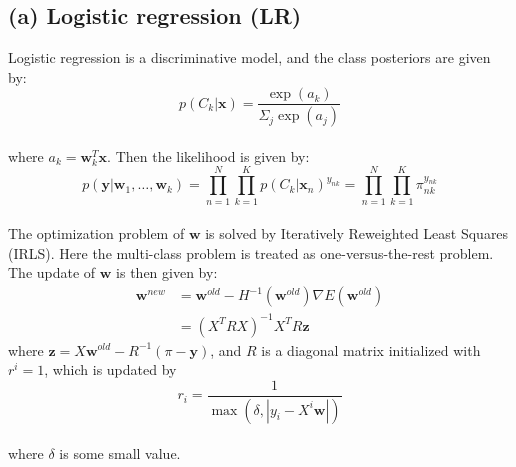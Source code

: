 \documentclass[a4paper]{article}
\begin{document}
\subsection{(a) Logistic regression (LR)}
Logistic regression is a discriminative model, and the class posteriors are given by:\\
$$p(C_{k}|\mathbf{x})=\frac{\exp(a_{k})}{\Sigma_{j}\exp(a_{j})}$$\\
where $a_{k}=\mathbf{w}_{k}^T\mathbf{x}$. Then the likelihood is given by:\\
$$p(\mathbf{y}|\mathbf{w}_{1},\dots,\mathbf{w}_{k}) = \prod_{n=1}^N\prod_{k=1}^K p(C_{k}|\mathbf{x}_{n})^{y_{nk}} = \prod_{n=1}^N\prod_{k=1}^K \pi_{nk}^{y_{nk}}$$\\
The optimization problem of $\mathbf{w}$ is solved by Iteratively Reweighted Least Squares (IRLS). Here the multi-class problem is treated as one-versus-the-rest problem. The update of $\mathbf{w}$ is then given by:\\
\begin{align*}
    \mathbf{w}^{new} &= \mathbf{w}^{old}-H^{-1}(\mathbf{w}^{old})\nabla E(\mathbf{w}^{old})\\
    &= (X^{T}RX)^{-1}X^{T}R\mathbf{z}
\end{align*}
where $\mathbf{z}=X\mathbf{w}^{old}-R^{-1}(\pi-\mathbf{y})$, and $R$ is a diagonal matrix initialized with $r^{i}=1$, which is updated by\\
$$r_{i}=\frac{1}{\max(\delta, |y_{i}-X^{i}\mathbf{w}|)}$$\\
where $\delta$ is some small value.
\end{document}
